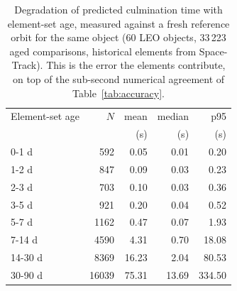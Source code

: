 \begin{table}[t]
\caption{Degradation of predicted culmination time with element-set age, measured against a fresh reference orbit for the same object (60 LEO objects, 33\,223 aged comparisons, historical elements from Space-Track). This is the error the elements contribute, on top of the sub-second numerical agreement of Table~\ref{tab:accuracy}.}
\label{tab:tleage}
\centering
\setlength{\tabcolsep}{4pt}
\begin{tabular}{lrrrr}
\toprule
Element-set age & $N$ & mean & median & p95 \\
& & (s) & (s) & (s) \\
\midrule
0-1 d & 592 & 0.05 & 0.01 & 0.20 \\
1-2 d & 847 & 0.09 & 0.03 & 0.23 \\
2-3 d & 703 & 0.10 & 0.03 & 0.36 \\
3-5 d & 921 & 0.20 & 0.04 & 0.52 \\
5-7 d & 1162 & 0.47 & 0.07 & 1.93 \\
7-14 d & 4590 & 4.31 & 0.70 & 18.08 \\
14-30 d & 8369 & 16.23 & 2.04 & 80.53 \\
30-90 d & 16039 & 75.31 & 13.69 & 334.50 \\
\bottomrule
\end{tabular}
\end{table}
